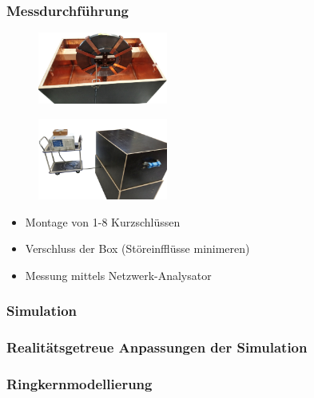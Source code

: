 \documentclass[accentcolor=tud9b, colorbacktitle, inverttitle]{tudbeamer}
\begin{document}
\begin{frame}\frametitle{Messdurchf\"uhrung}
\vspace{-1em}
\begin{multicols}{2}
	\begin{figure}[h]
		\centering
		\includegraphics[width=0.38\textwidth]{BoxKreuzPolygonRK8Ks}
	\end{figure}
	\begin{figure}[h]
		\centering
		\includegraphics[width=0.38\textwidth]{messstand}
	\end{figure}
	\vfill\null
	\columnbreak
	\begin{itemize}
		\item Montage von 1-8 Kurzschl\"ussen
		\item Verschluss der Box (St\"oreinffl\"usse minimeren)
		\item Messung mittels Netzwerk-Analysator
	\end{itemize}
\end{multicols}
\end{frame}






\begin{frame}\frametitle{Simulation}

\end{frame}


\begin{frame}\frametitle{Realit\"atsgetreue Anpassungen der Simulation}

\end{frame}



\begin{frame}\frametitle{Ringkernmodellierung}

\end{frame}
\end{document}
